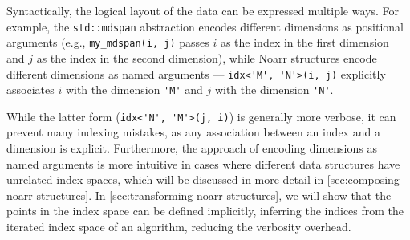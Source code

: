 Syntactically, the logical layout of the data can be expressed multiple ways. For example, the \lstinline{std::mdspan} abstraction encodes different dimensions as positional arguments (e.g., \lstinline{my_mdspan(i, j)} passes $i$ as the index in the first dimension and $j$ as the index in the second dimension), while Noarr structures encode different dimensions as named arguments --- \lstinline{idx<'M', 'N'>(i, j)} explicitly associates $i$ with the dimension \lstinline{'M'} and $j$ with the dimension \lstinline{'N'}.

While the latter form (\lstinline{idx<'N', 'M'>(j, i)}) is generally more verbose, it can prevent many indexing mistakes, as any association between an index and a dimension is explicit. Furthermore, the approach of encoding dimensions as named arguments is more intuitive in cases where different data structures have unrelated index spaces, which will be discussed in more detail in \cref{sec:composing-noarr-structures}. In \cref{sec:transforming-noarr-structures}, we will show that the points in the index space can be defined implicitly, inferring the indices from the iterated index space of an algorithm, reducing the verbosity overhead.



